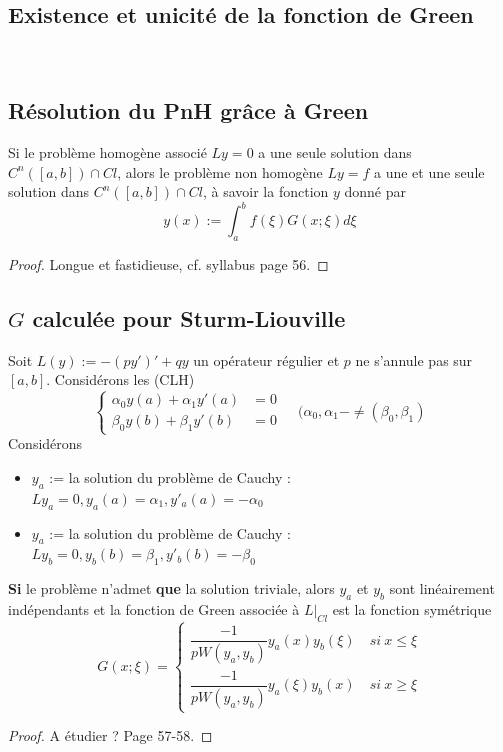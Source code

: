 \documentclass[11pt, a4paper, openany]{book}
\begin{document}
			\subsection{Existence et unicité de la fonction de Green}
			\ \\
																
			\setcounter{subsection}{5}
			\subsection{Résolution du PnH grâce à Green}
			Si le problème homogène associé $Ly = 0$ a une seule solution dans $C^n([a,b]) \cap Cl$, alors le problème non homogène $Ly = f$ a une et une seule solution dans $C^n([a,b]) \cap Cl$, à savoir la fonction $y$ donné par
			\begin{equation}
				y(x) := \int_a^b f(\xi)G(x;\xi)d\xi
			\end{equation}
			\begin{proof}
				Longue et fastidieuse, cf. syllabus page 56.
			\end{proof}
																
			\newpage
			\subsection{$G$ calculée pour Sturm-Liouville}
			Soit $L(y) := -(py')' + qy$ un opérateur régulier et $p$ ne s'annule pas sur $[a,b]$. Considérons les (CLH)
			\begin{equation}
				\left\{\begin{array}{ll}
				\alpha_0y(a) + \alpha_1y'(a) &=0\\
				\beta_0y(b) + \beta_1y'(b) &=0
				\end{array}\right.\ \ \ \ \ (\alpha_0,\alpha_1- \neq (\beta_0,\beta_1)
			\end{equation}
			Considérons
			\begin{itemize}
				\item $y_a$ := la solution du problème de Cauchy : $Ly_a = 0,y_a(a) = \alpha_1, y'_a(a) = -\alpha_0$
				\item $y_a$ := la solution du problème de Cauchy : $Ly_b = 0,y_b(b) = \beta_1, y'_b(b) = -\beta_0$
			\end{itemize}
			\textbf{Si} le problème n'admet \textbf{que} la solution triviale, alors $y_a$ et $y_b$ sont linéairement indépendants et la fonction de Green associée à $L|_{Cl}$ est la fonction symétrique
			\begin{equation}
				G(x;\xi) = \left\{\begin{array}{ll}
				\dfrac{-1}{pW(y_a,y_b)}y_a(x)y_b(\xi) &\ si\ x\leq \xi\\
				\dfrac{-1}{pW(y_a,y_b)}y_a(\xi)y_b(x) &\ si\ x\geq \xi
				\end{array}\right.
			\end{equation}
			\begin{proof}
				A étudier ? Page 57-58.
			\end{proof}
																
\end{document}
